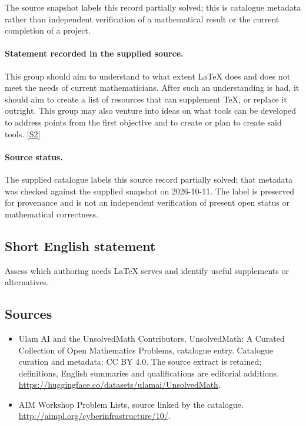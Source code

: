 \documentclass[11pt]{article}
\begin{document}
The source snapshot labels this record partially solved; this is catalogue metadata rather than independent verification of a mathematical result or the current completion of a project.
\paragraph{Statement recorded in the supplied source.}
This group should aim to understand to what extent LaTeX does and does not meet the needs of current mathematicians. After such an understanding is had, it should aim to create a list of resources that can supplement TeX, or replace it outright. This group may also venture into ideas on what tools can be developed to address points from the first objective and to create or plan to create said tools. \href{http://aimpl.org/cyberinfrastructure/10/}{[S2]}
\paragraph{Source status.}
The supplied catalogue labels this source record partially solved; that metadata was checked against the supplied snapshot on 2026-10-11. The label is preserved for provenance and is not an independent verification of present open status or mathematical correctness.
\subsection{Short English statement}
Assess which authoring needs LaTeX serves and identify useful supplements or alternatives.
\subsection{Sources}
\begin{itemize}
\item[S1] Ulam AI and the UnsolvedMath Contributors, UnsolvedMath: A Curated Collection of Open Mathematics Problems, catalogue entry. Catalogue curation and metadata: CC BY 4.0. The source extract is retained; definitions, English summaries and qualifications are editorial additions.
\url{https://huggingface.co/datasets/ulamai/UnsolvedMath}.
\item[S2] AIM Workshop Problem Lists, source linked by the catalogue.
\url{http://aimpl.org/cyberinfrastructure/10/}.
\end{itemize}
\end{document}
